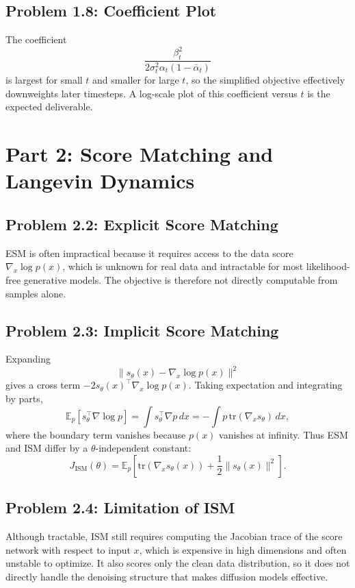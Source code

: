 \documentclass[11pt]{article}
\begin{document}
\subsection*{Problem 1.8: Coefficient Plot}
The coefficient
\[
\frac{\beta_t^2}{2\sigma_t^2\alpha_t(1-\bar\alpha_t)}
\]
is largest for small $t$ and smaller for large $t$, so the simplified objective effectively downweights later timesteps. A log-scale plot of this coefficient versus $t$ is the expected deliverable.

\section{Part 2: Score Matching and Langevin Dynamics}

\subsection*{Problem 2.2: Explicit Score Matching}
ESM is often impractical because it requires access to the data score $\nabla_x \log p(x)$, which is unknown for real data and intractable for most likelihood-free generative models. The objective is therefore not directly computable from samples alone.

\subsection*{Problem 2.3: Implicit Score Matching}
Expanding
\[
\|s_\theta(x)-\nabla_x\log p(x)\|^2
\]
gives a cross term $-2s_\theta(x)^\top \nabla_x\log p(x)$. Taking expectation and integrating by parts,
\[
\mathbb{E}_p[s_\theta^\top \nabla \log p]
= \int s_\theta^\top \nabla p\,dx
= -\int p\,\mathrm{tr}(\nabla_x s_\theta)\,dx,
\]
where the boundary term vanishes because $p(x)$ vanishes at infinity. Thus ESM and ISM differ by a $\theta$-independent constant:
\[
J_{\mathrm{ISM}}(\theta)=\mathbb{E}_p\!\left[\mathrm{tr}(\nabla_x s_\theta(x))+\frac{1}{2}\|s_\theta(x)\|^2\right].
\]

\subsection*{Problem 2.4: Limitation of ISM}
Although tractable, ISM still requires computing the Jacobian trace of the score network with respect to input $x$, which is expensive in high dimensions and often unstable to optimize. It also scores only the clean data distribution, so it does not directly handle the denoising structure that makes diffusion models effective.
\end{document}
